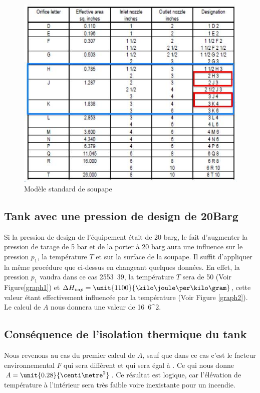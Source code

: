 \begin{figure}[ht!]
\centering
\includegraphics[scale=0.4]{tab.jpg}
\caption{Modèle standard de soupape}
\label{tab}
\end{figure}

\subsection{Tank avec une pression de design de \unit{20}{Barg}}
Si la pression de design de l’équipement était de 20 barg, le fait d’augmenter la pression de tarage de 5 bar et de la porter à 20 barg aura une influence sur le pression $p_1$, la température $T$ et sur la surface de la soupape.
Il suffit d'appliquer la même procédure que ci-dessus en changeant quelques données. En effet, la pression $p_1$ vaudra dans ce cas \unit{2553.39}{\kilo \pascal}, la température $T$ sera de \unit{50}{\celsius} (Voir Figure\ref{graph1}) et $\Delta H_{vap}=\unit{1100}{\kilo \joule \per \kilo \gram}$, cette valeur étant effectivement influencée par la température (Voir Figure \ref{graph2}). Le calcul de $A$ nous donnera une valeur de \unit{16.6}{\centi \metre^2}.

\subsection{Conséquence de l'isolation thermique du tank}

Nous revenons au cas du premier calcul de $A$, sauf que dans ce cas c'est le facteur environnemental $F$ qui sera différent et qui sera égal à . Ce qui nous donne $A=\unit{0.28}{\centi \metre^2}$. Ce résultat est logique, car l'élévation de température à l'intérieur sera très faible voire inexistante pour un incendie.

